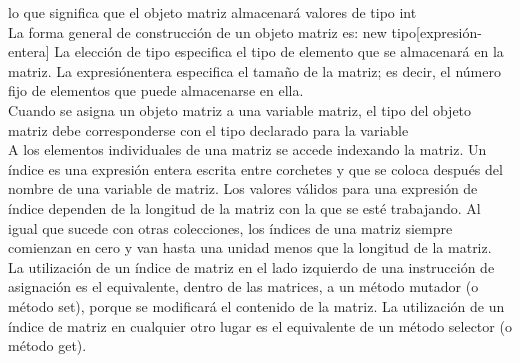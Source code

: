 \documentclass[11pt,a4paper]{article}
\begin{document}
lo que significa que el objeto matriz almacenará valores de tipo int\\
La forma general de construcción de un objeto matriz es:
new tipo[expresión-entera]
La elección de tipo especifica el tipo de elemento que se almacenará en la matriz. La expresiónentera
especifica el tamaño de la matriz; es decir, el número fijo de elementos que puede almacenarse
en ella.\\
Cuando se asigna un objeto matriz a una variable matriz, el tipo del objeto matriz debe corresponderse
con el tipo declarado para la variable\\
A los elementos individuales de una matriz se accede indexando la matriz. Un índice es una expresión
entera escrita entre corchetes y que se coloca después del nombre de una variable de matriz. Los valores válidos para una expresión de índice dependen de la longitud de la matriz con la que
se esté trabajando. Al igual que sucede con otras colecciones, los índices de una matriz siempre
comienzan en cero y van hasta una unidad menos que la longitud de la matriz.\\
La utilización de un índice de matriz en el lado izquierdo de una instrucción de asignación es el
equivalente, dentro de las matrices, a un método mutador (o método set), porque se modificará
el contenido de la matriz. La utilización de un índice de matriz en cualquier otro lugar es el equivalente
de un método selector (o método get).
\end{document}
